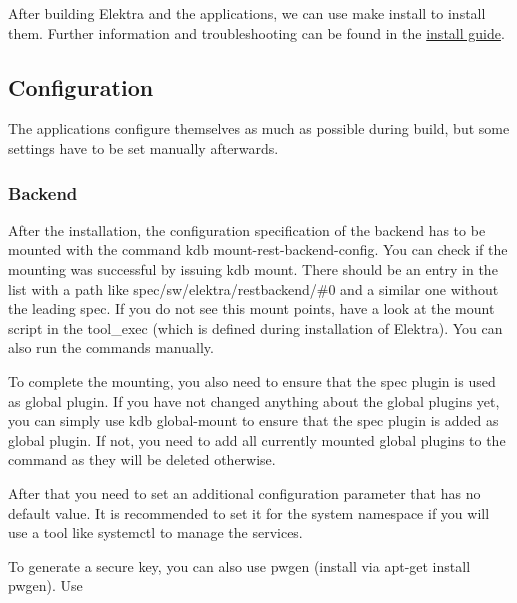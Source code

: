 After building Elektra and the applications, we can use {\ttfamily make install} to install them. Further information and troubleshooting can be found in the \hyperlink{doc_INSTALL_md}{install guide}.

\subsection*{Configuration}

The applications configure themselves as much as possible during build, but some settings have to be set manually afterwards.

\subsubsection*{Backend}

After the installation, the configuration specification of the backend has to be mounted with the command {\ttfamily kdb mount-\/rest-\/backend-\/config}. You can check if the mounting was successful by issuing {\ttfamily kdb mount}. There should be an entry in the list with a path like {\ttfamily spec/sw/elektra/restbackend/\#0} and a similar one without the leading {\ttfamily spec}. If you do not see this mount points, have a look at the mount script in the tool\+\_\+exec (which is defined during installation of Elektra). You can also run the commands manually.

To complete the mounting, you also need to ensure that the {\ttfamily spec} plugin is used as global plugin. If you have not changed anything about the global plugins yet, you can simply use {\ttfamily kdb global-\/mount} to ensure that the {\ttfamily spec} plugin is added as global plugin. If not, you need to add all currently mounted global plugins to the command as they will be deleted otherwise.

After that you need to set an additional configuration parameter that has no default value. It is recommended to set it for the system namespace if you will use a tool like {\ttfamily systemctl} to manage the services.




To generate a secure key, you can also use {\ttfamily pwgen} (install via {\ttfamily apt-\/get install pwgen}). Use




